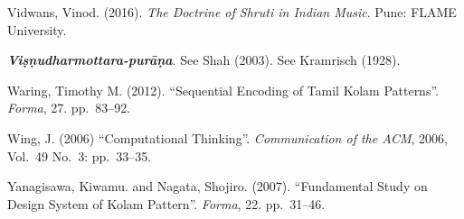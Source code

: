 \begin{thebibliography}{99}
Vidwans, Vinod. (2016). \textsl{The Doctrine of Shruti in Indian Music}. Pune: FLAME University.

\textsl{\textbf{Viṣṇudharmottara-purāṇa}}. See Shah (2003). See Kramrisch (1928).

Waring, Timothy M. (2012). “Sequential Encoding of Tamil Kolam Patterns”. \textsl{Forma}, 27. pp.~83--92.

Wing, J. (2006) “Computational Thinking”. \textsl{Communication of the ACM}, 2006, Vol.~49 No.~3: pp.~33--35.

Yanagisawa, Kiwamu. and Nagata, Shojiro. (2007). “Fundamental Study on Design System of Kolam Pattern”. \textsl{Forma}, 22. pp.~31--46.

\end{thebibliography}

\theendnotes
\label{chapter-3:end}
